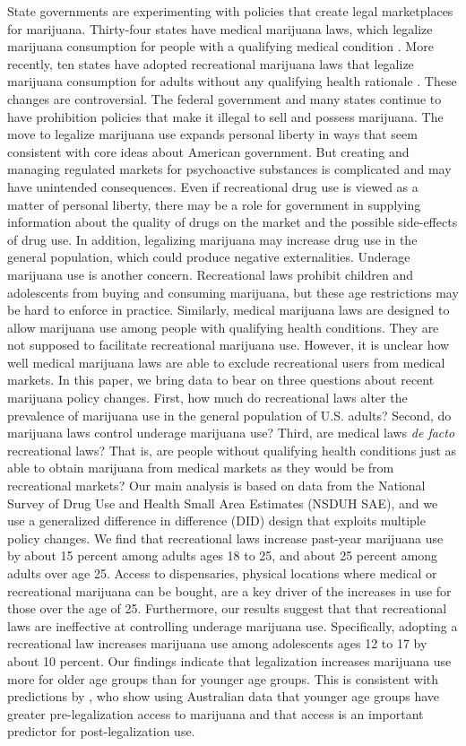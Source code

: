\documentclass[12pt]{article}%
\begin{document}
State governments are experimenting with policies that create legal marketplaces for marijuana. Thirty-four states have medical marijuana laws, which legalize marijuana consumption for people with a qualifying medical condition \citep{ProCon2018b}. More recently, ten states have adopted recreational marijuana laws that legalize marijuana consumption for adults without any qualifying health rationale \citep{ProCon2018}. These changes are controversial. The federal government and many states continue to have prohibition policies that make it illegal to sell and possess marijuana. 
The move to legalize marijuana use expands personal liberty in ways that seem consistent with core ideas about American government. But creating and managing regulated markets for psychoactive substances is complicated and may have unintended consequences. Even if recreational drug use is viewed as a matter of personal liberty, there may be a role for government in supplying information about the quality of drugs on the market and the possible side-effects of drug use. In addition, legalizing marijuana may increase drug use in the general population, which could produce negative externalities. Underage marijuana use is another concern. Recreational laws prohibit children and adolescents from buying and consuming marijuana, but these age restrictions may be hard to enforce in practice. Similarly, medical marijuana laws are designed to allow marijuana use among people with qualifying health conditions. They are not supposed to facilitate recreational marijuana use. However, it is unclear how well medical marijuana laws are able to exclude recreational users from medical markets.
In this paper, we bring data to bear on three questions about recent marijuana policy changes. First, how much do recreational laws alter the prevalence of marijuana use in the general population of U.S. adults? Second, do marijuana laws control underage marijuana use? Third, are medical laws \emph{de facto} recreational laws? That is, are people without qualifying health conditions just as able to obtain marijuana from medical markets as they would be from recreational markets? Our main analysis is based on data from the National Survey of Drug Use and Health Small Area Estimates (NSDUH SAE), and we use a generalized difference in difference (DID) design that exploits multiple policy changes. We find that recreational laws increase past-year marijuana use by about 15 percent among adults ages 18 to 25, and about 25 percent among adults over age 25. Access to dispensaries, physical locations where medical or recreational marijuana can be bought, are a key driver of the increases in use for those over the age of 25. Furthermore, our results suggest that that recreational laws are ineffective at controlling underage marijuana use. Specifically, adopting a recreational law increases marijuana use among adolescents ages 12 to 17 by about 10 percent. Our findings indicate that legalization increases marijuana use more for older age groups than for younger age groups. This is consistent with predictions by \citet{Jacobi2016}, who show using Australian data that younger age groups have greater pre-legalization access to marijuana and that access is an important predictor for post-legalization use. 
\end{document}
